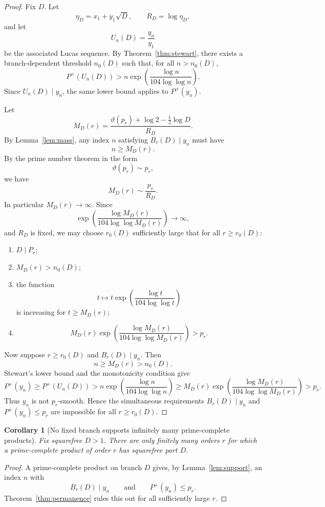 \documentclass[11pt]{article}
\newtheorem{corollary}[theorem]{Corollary}
\theoremstyle{definition}
\newcommand{\Pplus}{P^{+}}
\newcommand{\thetafun}{\vartheta}
\begin{document}
\begin{proof}
Fix $D$.  Let
\[
  \eta_D=x_1+y_1\sqrt D,
  \qquad
  R_D=\log\eta_D,
\]
and let
\[
  U_n(D)=\frac{y_n}{y_1}
\]
be the associated Lucas sequence.  By Theorem~\ref{thm:stewart}, there exists a
branch-dependent threshold $n_0(D)$ such that, for all $n>n_0(D)$,
\[
  \Pplus(U_n(D))
  >
  n\exp\!\left(\frac{\log n}{104\log\log n}\right).
\]
Since $U_n(D)\mid y_n$, the same lower bound applies to $\Pplus(y_n)$.

Let
\[
  M_D(r)=\frac{\thetafun(p_r)+\log 2-\frac12\log D}{R_D}.
\]
By Lemma~\ref{lem:mass}, any index $n$ satisfying $B_r(D)\mid y_n$ must have
\[
  n\ge M_D(r).
\]
By the prime number theorem in the form
\[
  \thetafun(p_r)\sim p_r,
\]
we have
\[
  M_D(r)\sim \frac{p_r}{R_D}.
\]
In particular $M_D(r)\to\infty$.  Since
\[
  \exp\!\left(\frac{\log M_D(r)}{104\log\log M_D(r)}\right)\to\infty,
\]
and $R_D$ is fixed, we may choose $r_0(D)$ sufficiently large that for all
$r\ge r_0(D)$:
\begin{enumerate}[label=(\roman*)]
  \item $D\mid P_r$;
  \item $M_D(r)>n_0(D)$;
  \item the function
  \[
    t\mapsto t\exp\!\left(\frac{\log t}{104\log\log t}\right)
  \]
  is increasing for $t\ge M_D(r)$;
  \item
  \[
    M_D(r)\exp\!\left(\frac{\log M_D(r)}{104\log\log M_D(r)}\right)>p_r.
  \]
\end{enumerate}
Now suppose $r\ge r_0(D)$ and $B_r(D)\mid y_n$.  Then
\[
  n\ge M_D(r)>n_0(D).
\]
Stewart's lower bound and the monotonicity condition give
\[
  \Pplus(y_n)
  \ge
  \Pplus(U_n(D))
  >
  n\exp\!\left(\frac{\log n}{104\log\log n}\right)
  \ge
  M_D(r)\exp\!\left(\frac{\log M_D(r)}{104\log\log M_D(r)}\right)
  >p_r.
\]
Thus $y_n$ is not $p_r$-smooth.  Hence the simultaneous requirements
$B_r(D)\mid y_n$ and $\Pplus(y_n)\le p_r$ are impossible for all $r\ge r_0(D)$.
\end{proof}

\begin{corollary}[No fixed branch supports infinitely many prime-complete products]
\label{cor:fixedbranch}
Fix squarefree $D>1$.  There are only finitely many orders $r$ for which a
prime-complete product of order $r$ has squarefree part $D$.
\end{corollary}

\begin{proof}
A prime-complete product on branch $D$ gives, by Lemma~\ref{lem:support}, an
index $n$ with
\[
  B_r(D)\mid y_n
  \qquad\text{and}\qquad
  \Pplus(y_n)\le p_r.
\]
Theorem~\ref{thm:permanence} rules this out for all sufficiently large $r$.
\end{proof}
\end{document}
